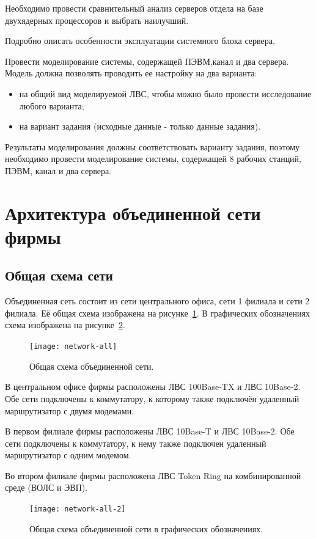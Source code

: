 \documentclass[russian,utf8,emptystyle]{eskdtext}
\begin{document}
Необходимо провести сравнительный анализ серверов отдела на базе двухядерных процессоров  и выбрать наилучший.

Подробно описать особенности эксплуатации  системного блока сервера.

Провести моделирование системы, содержащей ПЭВМ,канал и два сервера. Модель должна позволять проводить ее настройку на два варианта:
\begin{itemize}
\item на общий вид моделируемой ЛВС, чтобы можно было провести исследование любого варианта;
\item на вариант задания (исходные данные - только данные задания). 
\end{itemize}

Результаты моделирования должны соответствовать варианту задания, поэтому  необходимо провести  моделирование системы, содержащей 8 рабочих станций, ПЭВМ, канал и два сервера.

\clearpage
\section{Архитектура объединенной сети фирмы}
\subsection{Общая схема сети}
Объединенная сеть состоит из сети центрального офиса, сети 1 филиала и сети 2 филиала. Её общая схема изображена на рисунке~\ref{fig:network-all}. В графических обозначениях схема изображена на рисунке~\ref{fig:network-all-2}.

\begin{figure}[h!]
\centering
\texttt{[image: network-all]}
\caption{Общая схема объединенной сети.}
\label{fig:network-all}
\end{figure}

В центральном офисе фирмы расположены ЛВС 100Base-TX и ЛВС 10Base-2. Обе сети подключены к коммутатору, к которому также подключён удаленный маршрутизатор с двумя модемами.

В первом филиале фирмы расположены ЛВС 10Base-T и ЛВС 10Base-2. Обе сети подключены к коммутатору, к нему также подключен удаленный маршрутизатор с одним модемом.

Во втором филиале фирмы расположена ЛВС Token Ring на комбинированной среде (ВОЛС и ЭВП).

\begin{figure}[h!]
\centering
\texttt{[image: network-all-2]}
\caption{Общая схема объединенной сети в графических обозначениях.}
\label{fig:network-all-2}
\end{figure}
\end{document}
